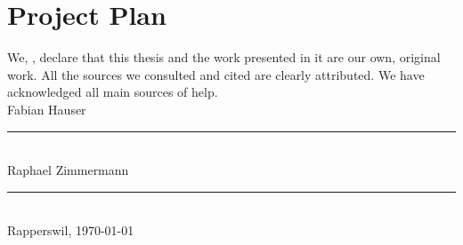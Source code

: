 \section{Project Plan}\label{sec:project-plan}







\begin{declaration}
\addchaptertocentry{\authorshipname} %
\noindent We, \authorname, declare that this thesis and the work presented in it are our own, original work.  All the sources we consulted and cited are clearly attributed. We have acknowledged all main sources of help. \\

\noindent Fabian Hauser\\[2em]
\rule[0.5em]{25em}{0.5pt}\\ %
\noindent Raphael Zimmermann\\[2em]
\rule[0.5em]{25em}{0.5pt}\\ %
\noindent Rapperswil, \today
\end{declaration}

\cleardoublepage



  
